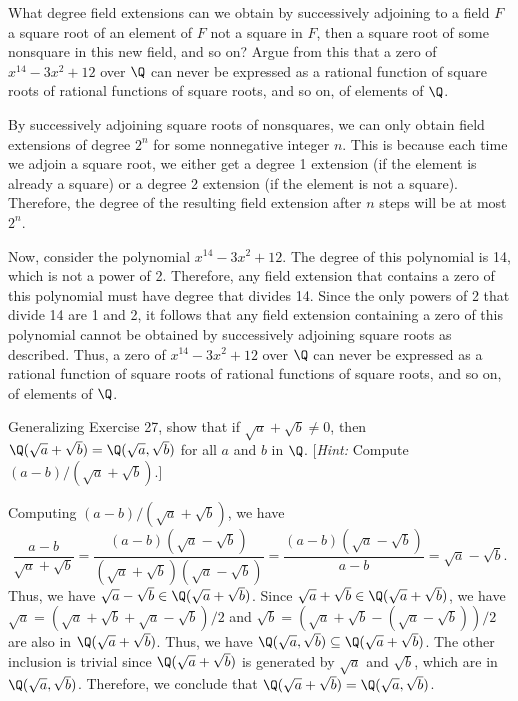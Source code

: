 \begin{problem}[40.25]
  What degree field extensions can we obtain by successively adjoining to a field $F$ a square root of an element of $F$ not a square in $F$, then a square root of some nonsquare in this new field, and so on? Argue from this that a zero of $x^{14} - 3x^2 + 12$ over $\Q$ can never be expressed as a rational function of square roots of rational functions of square roots, and so on, of elements of $\Q$.
\end{problem}

\begin{solution}
  By successively adjoining square roots of nonsquares, we can only obtain field extensions of degree $2^n$ for some nonnegative integer $n$. This is because each time we adjoin a square root, we either get a degree 1 extension (if the element is already a square) or a degree 2 extension (if the element is not a square). Therefore, the degree of the resulting field extension after $n$ steps will be at most $2^n$.

  Now, consider the polynomial $x^{14} - 3x^2 + 12$. The degree of this polynomial is 14, which is not a power of 2. Therefore, any field extension that contains a zero of this polynomial must have degree that divides 14. Since the only powers of 2 that divide 14 are 1 and 2, it follows that any field extension containing a zero of this polynomial cannot be obtained by successively adjoining square roots as described. Thus, a zero of $x^{14} - 3x^2 + 12$ over $\Q$ can never be expressed as a rational function of square roots of rational functions of square roots, and so on, of elements of $\Q$.
\end{solution}

\begin{problem}[40.28]
  Generalizing Exercise 27, show that if $\sqrt{a} + \sqrt{b} \ne 0$, then $\Q(\sqrt{a} + \sqrt{b}) = \Q(\sqrt{a}, \sqrt{b})$ for all $a$ and $b$ in $\Q$. [\textit{Hint:} Compute $(a - b)/(\sqrt{a} + \sqrt{b})$.]
\end{problem}

\begin{solution}
  Computing $(a - b)/(\sqrt{a} + \sqrt{b})$, we have
  \[%
    \frac{a - b}{\sqrt{a} + \sqrt{b}} = \frac{(a - b)(\sqrt{a} - \sqrt{b})}{(\sqrt{a} + \sqrt{b})(\sqrt{a} - \sqrt{b})} = \frac{(a - b)(\sqrt{a} - \sqrt{b})}{a - b} = \sqrt{a} - \sqrt{b}
  .\]%
  Thus, we have $\sqrt{a} - \sqrt{b} \in \Q(\sqrt{a} + \sqrt{b})$. Since $\sqrt{a} + \sqrt{b} \in \Q(\sqrt{a} + \sqrt{b})$, we have $\sqrt{a} = (\sqrt{a} + \sqrt{b} + \sqrt{a} - \sqrt{b})/2$ and $\sqrt{b} = (\sqrt{a} + \sqrt{b} - (\sqrt{a} - \sqrt{b}))/2$ are also in $\Q(\sqrt{a} + \sqrt{b})$. Thus, we have $\Q(\sqrt{a}, \sqrt{b}) \subseteq \Q(\sqrt{a} + \sqrt{b})$. The other inclusion is trivial since $\Q(\sqrt{a} + \sqrt{b})$ is generated by $\sqrt{a}$ and $\sqrt{b}$, which are in $\Q(\sqrt{a}, \sqrt{b})$. Therefore, we conclude that $\Q(\sqrt{a} + \sqrt{b}) = \Q(\sqrt{a}, \sqrt{b})$.
\end{solution}

